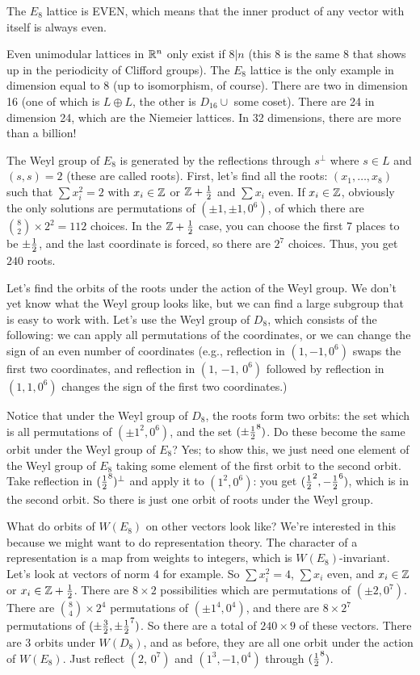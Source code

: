   The $E_8$ lattice is EVEN, which means that the inner product of any vector with
  itself is always even.

  Even unimodular lattices in $\mathbb{R}^n$ only exist if $8|n$ (this $8$ is the same $8$
 that shows up in the periodicity of Clifford groups). The $E_8$ lattice is the only
 example in dimension equal to $8$ (up to isomorphism, of course). There are two in
 dimension 16 (one of which is $L\oplus L$, the other is $D_{16}\cup$ some coset).
 There are 24 in dimension 24, which are the Niemeier lattices. In 32 dimensions,
 there are more than a billion!

 The Weyl group of $E_8$ is generated by the reflections through $s^\perp$ where $s
 \in L$ and $(s,s)=2$ (these are called roots). First, let's find all the roots:
 $(x_1,\dots,x_8)$ such that $\sum x_i^2=2$ with $x_i\in \mathbb{Z}$ or $\mathbb{Z}+\frac{1}{2}$ and $\sum
 x_i$ even. If $x_i \in \mathbb{Z}$, obviously the only solutions are permutations of $(\pm
 1, \pm 1, 0^6)$, of which there are $\binom{8}{2}\times 2^2=112$ choices. In the
 $\mathbb{Z}+\frac{1}{2}$ case, you can choose the first 7 places to be $\pm \frac{1}{2}$, and the last
 coordinate is forced, so there are $2^7$ choices. Thus, you get $240$ roots.

 Let's find the orbits of the roots under the action of the Weyl group. We don't yet
 know what the Weyl group looks like, but we can find a large subgroup that is easy to
 work with. Let's use the Weyl group of $D_8$, which consists of the following: we can
 apply all permutations of the coordinates, or we can change the sign of an even
 number of coordinates (e.g., reflection in $(1 , {-1} , 0^6)$ swaps the first two
 coordinates, and reflection in $(1 , \, {-1} , \, 0^6)$ followed by reflection in $(1
 ,  1, 0^6)$ changes the sign of the first two coordinates.)

 Notice that under the Weyl group of $D_8$, the roots form two orbits: the set which
 is all permutations of $(\pm 1^2 , 0^6)$, and the set $(\pm \frac{1}{2}^8)$. Do these
 become the same orbit under the Weyl group of $E_8$? Yes; to show this, we just need
 one element of the Weyl group of $E_8$ taking some element of the first orbit to the
 second orbit. Take reflection in $(\frac{1}{2}^8)^\perp$ and apply it to $(1^2 , 0^6)$: you
 get $(\frac{1}{2}^2 , -\frac{1}{2}^6)$, which is in the second orbit. So there is just one orbit
 of roots under the Weyl group.

 What do orbits of $W(E_8)$ on other vectors look like? We're interested in this
 because we might want to do representation theory. The character of a representation
 is a map from weights to integers, which is $W(E_8)$-invariant. Let's look at vectors
 of norm $4$ for example. So $\sum x_i^2=4$, $\sum x_i$ even, and $x_i\in \mathbb{Z}$ or
 $x_i\in \mathbb{Z}+\frac{1}{2}$. There are $8\times 2$ possibilities which are permutations of
 $(\pm 2 ,  0^7)$. There are $\binom 84 \times 2^4$ permutations of $(\pm 1^4 ,
 0^4)$, and there are $8\times 2^7$ permutations of  $(\pm \frac{3}{2}, \pm \frac{1}{2}^7)$.
 So there are a total of $240\times 9$ of these vectors. There are 3 orbits under
 $W(D_8)$, and as before, they are all one orbit under the action of $W(E_8)$. Just
 reflect $(2 , \, 0^7)$ and $(1^3 , -1, 0^4)$ through $(\frac{1}{2}^8)$.

